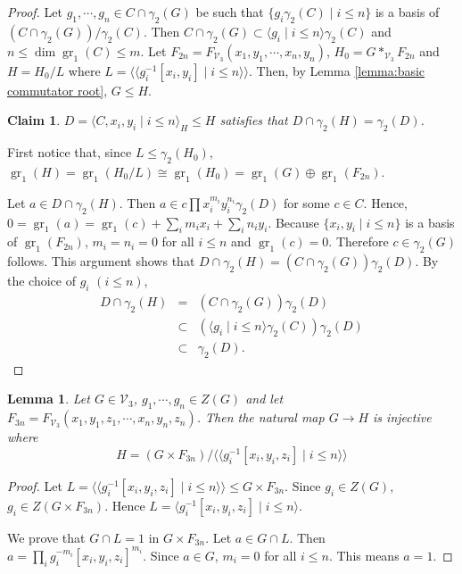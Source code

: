 \documentclass[11pt,reqno]{article}
\newtheorem{lemma}[theorem]{Lemma}
\newtheorem{claim}{Claim}[theorem]
\theoremstyle{definition}
\theoremstyle{remark}
\DeclareMathOperator{\gr}{gr}
\newcommand{\llangle}{\langle\!\langle}
\newcommand{\rrangle}{\rangle\!\rangle}
\begin{document}
\begin{proof}
    Let $g_1,\cdots, g_n\in C\cap \gamma_2(G)$ be such that $\{g_i\gamma_2(C)\mid i\leq n\}$ is a basis of $(C\cap \gamma_2(G))/\gamma_2(C)$.
    Then $C\cap \gamma_2(G)\subset \langle g_i\mid i\leq n\rangle \gamma_2(C)$ and $n\leq \dim\gr_1(C) \leq m$.
    Let $F_{2n}=F_{\mathcal V_3}(x_1,y_1,\cdots, x_n,y_n)$, $H_0=G*_{\mathcal V_3} F_{2n}$ and $H=H_0/L$ where $L=\llangle g_i^{-1}[x_i,y_i]\mid i\leq n\rrangle$.
    Then, by Lemma \ref{lemma:basic commutator root}, $G\leq H$.
    

    \begin{claim}
        $D=\langle C, x_i,y_i\mid i\leq n\rangle_H \leq H$ satisfies that $D\cap \gamma_2(H)=\gamma_2(D)$.
    \end{claim}
    First notice that, since $L\leq \gamma_2(H_0)$, $\gr_1(H)=\gr_1(H_0/L)\cong \gr_1(H_0)=\gr_1(G)\oplus \gr_1(F_{2n})$.

    Let $a\in D\cap \gamma_2(H)$.
    Then $a\in c\prod x_i^{m_i}y_i^{n_i}\gamma_2(D)$ for some $c\in C$.
    Hence, $0=\gr_1(a)=\gr_1(c)+\sum_i m_ix_i+\sum_i n_iy_i$.
    Because $\{x_i,y_i\mid i\leq n\}$ is a basis of $\gr_1(F_{2n})$, $m_i=n_i=0$ for all $i\leq n$ and $\gr_1(c)=0$. 
    Therefore $c\in \gamma_2(G)$ follows.
    This argument shows that $D\cap \gamma_2(H)=(C\cap \gamma_2(G))\gamma_2(D)$.
    By the choice of $g_i$ $(i\leq n)$, 
    \begin{eqnarray*}
        D\cap \gamma_2(H)&=& (C\cap \gamma_2(G))\gamma_2(D)\\ 
        &\subset& \left(\langle g_i\mid i\leq n\rangle\gamma_2(C)\right)\gamma_2(D)\\ 
        &\subset& \gamma_2(D). 
    \end{eqnarray*}
\end{proof}

\begin{lemma}\label{lemma:triple commutator root}
    Let $G\in\mathcal V_3$, $g_1,\cdots, g_n \in Z(G)$ and let $F_{3n}=F_{\mathcal V_3}(x_1,y_1,z_1,\cdots, x_n,y_n,z_n)$.
    Then
    the natural map $G\to H$ is injective where
    \[
        H=(G\times F_{3n})/\llangle g_i^{-1}[x_i,y_i,z_i]\mid i\leq n\rrangle
    \]
\end{lemma}

\begin{proof}
    Let $L=\llangle g_i^{-1}[x_i,y_i,z_i]\mid i\leq n\rrangle\leq G\times F_{3n}$.
    Since $g_i\in Z(G)$, $g_i\in Z(G\times F_{3n})$.
    Hence $L=\langle g_i^{-1}[x_i,y_i,z_i]\mid i\leq n\rangle$.

    We prove that $G\cap L=1$ in $G\times F_{3n}$.
    Let $a\in G\cap L$.
    Then $a=\prod_i g_i^{-m_i}[x_i,y_i,z_i]^{m_i}$.
    Since $a\in G$, $m_i=0$ for all $i\leq n$. 
    This means $a=1$.
\end{proof}
\end{document}
